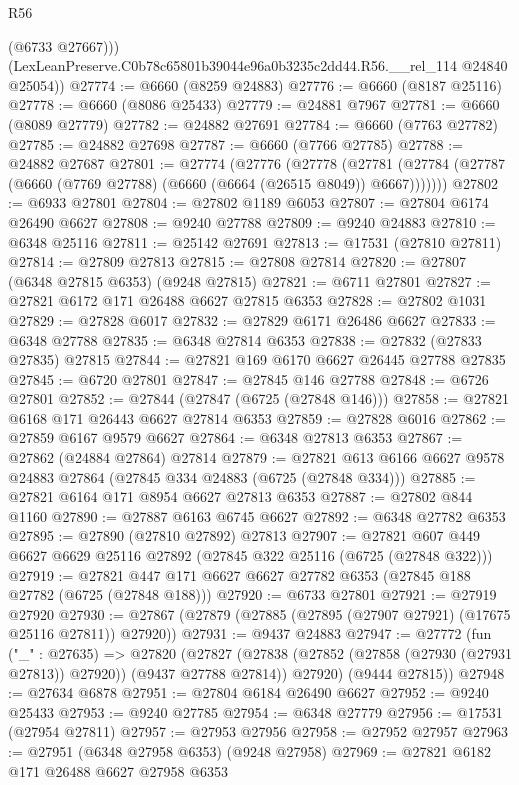 \begin{lexlean}{R56}
\begin{coremodule}
          (@6733 @27667)))
      (LexLeanPreserve.C0b78c65801b39044e96a0b3235c2dd44.R56.__rel_114 @24840 @25054))
@27774 := @6660 (@8259 @24883)
@27776 := @6660 (@8187 @25116)
@27778 := @6660 (@8086 @25433)
@27779 := @24881 @7967
@27781 := @6660 (@8089 @27779)
@27782 := @24882 @27691
@27784 := @6660 (@7763 @27782)
@27785 := @24882 @27698
@27787 := @6660 (@7766 @27785)
@27788 := @24882 @27687
@27801 := @27774
    (@27776
      (@27778
        (@27781 (@27784 (@27787 (@6660 (@7769 @27788) (@6660 (@6664 (@26515 @8049)) @6667)))))))
@27802 := @6933 @27801
@27804 := @27802 @1189 @6053
@27807 := @27804 @6174 @26490 @6627
@27808 := @9240 @27788
@27809 := @9240 @24883
@27810 := @6348 @25116
@27811 := @25142 @27691
@27813 := @17531 (@27810 @27811)
@27814 := @27809 @27813
@27815 := @27808 @27814
@27820 := @27807 (@6348 @27815 @6353) (@9248 @27815)
@27821 := @6711 @27801
@27827 := @27821 @6172 @171 @26488 @6627 @27815 @6353
@27828 := @27802 @1031
@27829 := @27828 @6017
@27832 := @27829 @6171 @26486 @6627
@27833 := @6348 @27788
@27835 := @6348 @27814 @6353
@27838 := @27832 (@27833 @27835) @27815
@27844 := @27821 @169 @6170 @6627 @26445 @27788 @27835
@27845 := @6720 @27801
@27847 := @27845 @146 @27788
@27848 := @6726 @27801
@27852 := @27844 (@27847 (@6725 (@27848 @146)))
@27858 := @27821 @6168 @171 @26443 @6627 @27814 @6353
@27859 := @27828 @6016
@27862 := @27859 @6167 @9579 @6627
@27864 := @6348 @27813 @6353
@27867 := @27862 (@24884 @27864) @27814
@27879 := @27821 @613 @6166 @6627 @9578 @24883 @27864 (@27845 @334 @24883 (@6725 (@27848 @334)))
@27885 := @27821 @6164 @171 @8954 @6627 @27813 @6353
@27887 := @27802 @844 @1160
@27890 := @27887 @6163 @6745 @6627
@27892 := @6348 @27782 @6353
@27895 := @27890 (@27810 @27892) @27813
@27907 := @27821 @607 @449 @6627 @6629 @25116 @27892 (@27845 @322 @25116 (@6725 (@27848 @322)))
@27919 := @27821 @447 @171 @6627 @6627 @27782 @6353 (@27845 @188 @27782 (@6725 (@27848 @188)))
@27920 := @6733 @27801
@27921 := @27919 @27920
@27930 := @27867 (@27879 (@27885 (@27895 (@27907 @27921) (@17675 @25116 @27811)) @27920))
@27931 := @9437 @24883
@27947 := @27772
    (fun ("_" : @27635) =>
    @27820
      (@27827
        (@27838 (@27852 (@27858 (@27930 (@27931 @27813)) @27920)) (@9437 @27788 @27814))
        @27920)
      (@9444 @27815))
@27948 := @27634 @6878
@27951 := @27804 @6184 @26490 @6627
@27952 := @9240 @25433
@27953 := @9240 @27785
@27954 := @6348 @27779
@27956 := @17531 (@27954 @27811)
@27957 := @27953 @27956
@27958 := @27952 @27957
@27963 := @27951 (@6348 @27958 @6353) (@9248 @27958)
@27969 := @27821 @6182 @171 @26488 @6627 @27958 @6353

\end{coremodule}
\end{lexlean}
